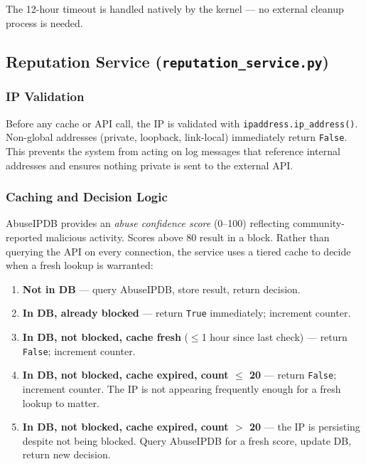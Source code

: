 \documentclass[11pt, letterpaper]{article}
\begin{document}
The 12-hour timeout is handled natively by the kernel --- no external cleanup process is needed.

\subsection{Reputation Service (\texttt{reputation\_service.py})}

\subsubsection*{IP Validation}

Before any cache or API call, the IP is validated with \texttt{ipaddress.ip\_address()}. Non-global addresses (private, loopback, link-local) immediately return \texttt{False}. This prevents the system from acting on log messages that reference internal addresses and ensures nothing private is sent to the external API.

\subsubsection*{Caching and Decision Logic}

AbuseIPDB provides an \textit{abuse confidence score} (0--100) reflecting community-reported malicious activity. Scores above 80 result in a block. Rather than querying the API on every connection, the service uses a tiered cache to decide when a fresh lookup is warranted:

\begin{enumerate}[leftmargin=2em, itemsep=2pt]
    \item \textbf{Not in DB} --- query AbuseIPDB, store result, return decision.
    \item \textbf{In DB, already blocked} --- return \texttt{True} immediately; increment counter.
    \item \textbf{In DB, not blocked, cache fresh} ($\leq$1 hour since last check) --- return \texttt{False}; increment counter.
    \item \textbf{In DB, not blocked, cache expired, count $\leq$ 20} --- return \texttt{False}; increment counter. The IP is not appearing frequently enough for a fresh lookup to matter.
    \item \textbf{In DB, not blocked, cache expired, count $>$ 20} --- the IP is persisting despite not being blocked. Query AbuseIPDB for a fresh score, update DB, return new decision.
\end{enumerate}
\end{document}
